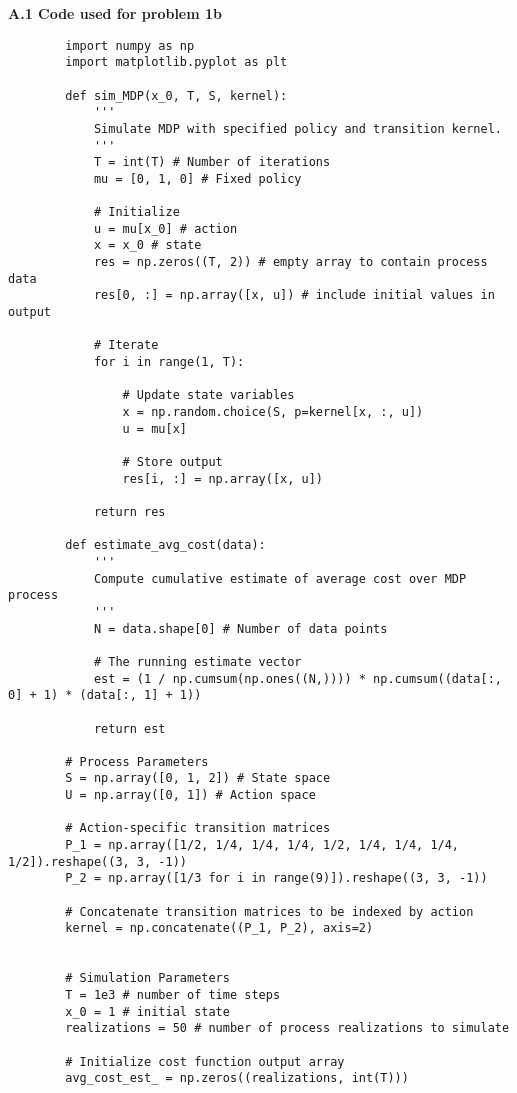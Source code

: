 \documentclass[11pt, letterpaper]{article}
\begin{document}
    {\bf A.1 Code used for problem 1b}
    \begin{verbatim}
        import numpy as np
        import matplotlib.pyplot as plt

        def sim_MDP(x_0, T, S, kernel):
            '''
            Simulate MDP with specified policy and transition kernel.
            '''
            T = int(T) # Number of iterations
            mu = [0, 1, 0] # Fixed policy

            # Initialize
            u = mu[x_0] # action
            x = x_0 # state
            res = np.zeros((T, 2)) # empty array to contain process data
            res[0, :] = np.array([x, u]) # include initial values in output

            # Iterate
            for i in range(1, T):

                # Update state variables
                x = np.random.choice(S, p=kernel[x, :, u])
                u = mu[x]

                # Store output
                res[i, :] = np.array([x, u])

            return res

        def estimate_avg_cost(data):
            '''
            Compute cumulative estimate of average cost over MDP process
            '''
            N = data.shape[0] # Number of data points

            # The running estimate vector
            est = (1 / np.cumsum(np.ones((N,)))) * np.cumsum((data[:, 0] + 1) * (data[:, 1] + 1))

            return est

        # Process Parameters
        S = np.array([0, 1, 2]) # State space
        U = np.array([0, 1]) # Action space

        # Action-specific transition matrices
        P_1 = np.array([1/2, 1/4, 1/4, 1/4, 1/2, 1/4, 1/4, 1/4, 1/2]).reshape((3, 3, -1))
        P_2 = np.array([1/3 for i in range(9)]).reshape((3, 3, -1))

        # Concatenate transition matrices to be indexed by action
        kernel = np.concatenate((P_1, P_2), axis=2)


        # Simulation Parameters
        T = 1e3 # number of time steps
        x_0 = 1 # initial state
        realizations = 50 # number of process realizations to simulate

        # Initialize cost function output array
        avg_cost_est_ = np.zeros((realizations, int(T)))


\end{verbatim}
\end{document}
